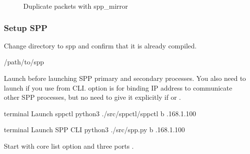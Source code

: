 \documentclass[a4paper,11pt,openany,oneside,english]{sphinxmanual}
\begin{document}
\begin{figure}[htbp]
\centering
\capstart

\noindent{}
\caption{Duplicate packets with spp\_mirror}\label{\detokenize{usecases/spp_mirror:id4}}\label{\detokenize{usecases/spp_mirror:figure-spp-mirror-use-cases-nw-config}}\end{figure}


\subsubsection{Setup SPP}
\label{\detokenize{usecases/spp_mirror:setup-spp}}
Change directory to spp and confirm that it is already compiled.

\begin{sphinxVerbatim}[commandchars=\\\{\},formatcom=\footnotesize]
  /path/to/spp
\end{sphinxVerbatim}

Launch  before launching SPP primary and secondary processes.
You also need to launch   if you use  from CLI.
 option is for binding IP address to communicate other SPP processes,
but no need to give it explicitly if  or  .

\begin{sphinxVerbatim}[commandchars=\\\{\},formatcom=\footnotesize]
 terminal 
 Launch spp\PYGZhy{}ctl
 python3 ./src/spp\PYGZhy{}ctl/spp\PYGZhy{}ctl \PYGZhy{}b .168.1.100
\end{sphinxVerbatim}

\begin{sphinxVerbatim}[commandchars=\\\{\},formatcom=\footnotesize]
 terminal 
 Launch SPP CLI
 python3 ./src/spp.py \PYGZhy{}b .168.1.100
\end{sphinxVerbatim}

Start  with core list option  and
three ports .
\end{document}
